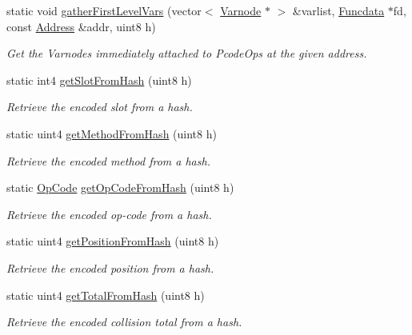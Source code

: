 \begin{DoxyCompactItemize}
\item 
static void \mbox{\hyperlink{class_dynamic_hash_a31d945277695dda3a0931fd29ee95234}{gather\+First\+Level\+Vars}} (vector$<$ \mbox{\hyperlink{class_varnode}{Varnode}} $\ast$ $>$ \&varlist, \mbox{\hyperlink{class_funcdata}{Funcdata}} $\ast$fd, const \mbox{\hyperlink{class_address}{Address}} \&addr, uint8 h)
\begin{DoxyCompactList}\small\item\em Get the Varnodes immediately attached to Pcode\+Ops at the given address. \end{DoxyCompactList}\item 
static int4 \mbox{\hyperlink{class_dynamic_hash_ac5d5cb3b8c23327a82efe7f5f011fbbf}{get\+Slot\+From\+Hash}} (uint8 h)
\begin{DoxyCompactList}\small\item\em Retrieve the encoded slot from a hash. \end{DoxyCompactList}\item 
static uint4 \mbox{\hyperlink{class_dynamic_hash_a0f43ee0fdfcd0ad103fc7125cc8d5ad0}{get\+Method\+From\+Hash}} (uint8 h)
\begin{DoxyCompactList}\small\item\em Retrieve the encoded method from a hash. \end{DoxyCompactList}\item 
static \mbox{\hyperlink{opcodes_8hh_abeb7dfb0e9e2b3114e240a405d046ea7}{Op\+Code}} \mbox{\hyperlink{class_dynamic_hash_acf0da7edbf8321e9489e819ffbb5111b}{get\+Op\+Code\+From\+Hash}} (uint8 h)
\begin{DoxyCompactList}\small\item\em Retrieve the encoded op-\/code from a hash. \end{DoxyCompactList}\item 
static uint4 \mbox{\hyperlink{class_dynamic_hash_a82c7a255745be65f7395d489a0bd4201}{get\+Position\+From\+Hash}} (uint8 h)
\begin{DoxyCompactList}\small\item\em Retrieve the encoded position from a hash. \end{DoxyCompactList}\item 
static uint4 \mbox{\hyperlink{class_dynamic_hash_a1776a0b6908b317435afca5d33954b44}{get\+Total\+From\+Hash}} (uint8 h)
\begin{DoxyCompactList}\small\item\em Retrieve the encoded collision total from a hash. \end{DoxyCompactList}\item 

\end{DoxyCompactItemize}
